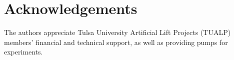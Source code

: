 \documentclass[preprint,12pt]{elsarticle}
\begin{document}
\printnomenclature

\section*{Acknowledgements}
The authors appreciate Tulsa University Artificial Lift Projects (TUALP) members’ financial and technical support, as well as providing pumps for experiments. 



% 















\end{document}
